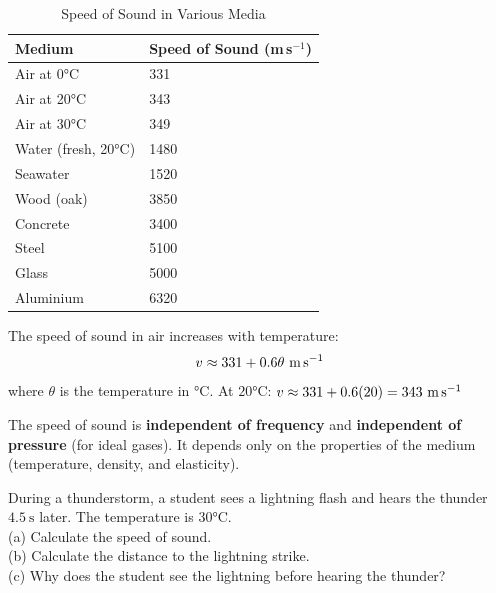 \begin{table}[H]
\centering
\caption{Speed of Sound in Various Media}
\label{tab:sound_speed}
\begin{tabular}{ll}
\toprule
\textbf{Medium} & \textbf{Speed of Sound (m\,s$^{-1}$)}\\
\midrule
Air at 0°C & 331\\
Air at 20°C & 343\\
Air at 30°C & 349\\
Water (fresh, 20°C) & 1480\\
Seawater & 1520\\
Wood (oak) & 3850\\
Concrete & 3400\\
Steel & 5100\\
Glass & 5000\\
Aluminium & 6320\\
\bottomrule
\end{tabular}
\end{table}

\begin{keybox}
The speed of sound in air increases with temperature:
\[
  v \approx 331 + 0.6\theta\ \text{m\,s}^{-1}
\]
where $\theta$ is the temperature in °C. At $20°\text{C}$:
$v \approx 331 + 0.6(20) = 343\ \text{m\,s}^{-1}$

The speed of sound is \textbf{independent of frequency}
and \textbf{independent of pressure} (for ideal gases).
It depends only on the properties of the medium
(temperature, density, and elasticity).
\end{keybox}

\begin{examplebox}[18.1]
During a thunderstorm, a student sees a lightning
flash and hears the thunder $4.5\ \text{s}$ later.
The temperature is $30°\text{C}$.\\
(a) Calculate the speed of sound.\\
(b) Calculate the distance to the lightning strike.\\
(c) Why does the student see the lightning before
hearing the thunder?
\end{examplebox}

